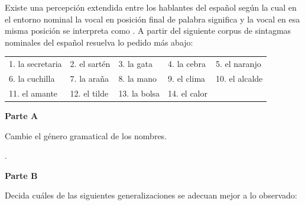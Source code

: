 \begin{ejercicio}\label{ej:04-genero}
Existe una percepción extendida entre los hablantes del español según la cual en
el entorno nominal la vocal  en posición final de palabra significa
 y la vocal  en esa misma posición se interpreta
como . A partir del siguiente corpus de sintagmas
nominales del español resuelva lo pedido más abajo:

\begin{tabular}{@{}lllll@{}}
  1. la secretaria & 2. el sartén   & 3. la gata    & 4. la cebra    & 5. el naranjo \\
  6. la cuchilla   & 7. la araña    & 8. la mano    & 9. el clima    & 10. el alcalde \\
  11. el amante    & 12. el tilde   & 13. la bolsa  & 14. el calor   & \\
\end{tabular}

\textbf{Parte A}

Cambie el género gramatical de los nombres.

\begin{resuelto}
.
\end{resuelto}

\textbf{Parte B}

Decida cuáles de las siguientes generalizaciones se adecuan mejor a lo
observado:


\end{ejercicio}
